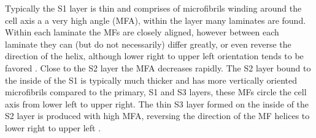 Typically the S1 layer is thin and comprises of microfibrils winding around the
cell axis a a very high angle (MFA), within the layer many laminates are found.
Within each laminate the MFs are closely aligned, however between each laminate
they can (but do not necessarily) differ greatly, or even reverse the direction
of the helix, although lower right to upper left
orientation tends to be favored \cite{fromm2013cellular}. Close to the S2 layer the MFA decreases
rapidly. The S2 layer bound to the inside of the S1 is typically much thicker and
has more vertically oriented microfibrils compared to the primary, S1 and S3
layers, these MFs circle the cell axis from lower left to upper right. The thin S3 layer formed on the inside of the S2 layer is produced with
high MFA, reversing the direction of the MF helices to lower right to upper
left \cite{walker1993primary}.